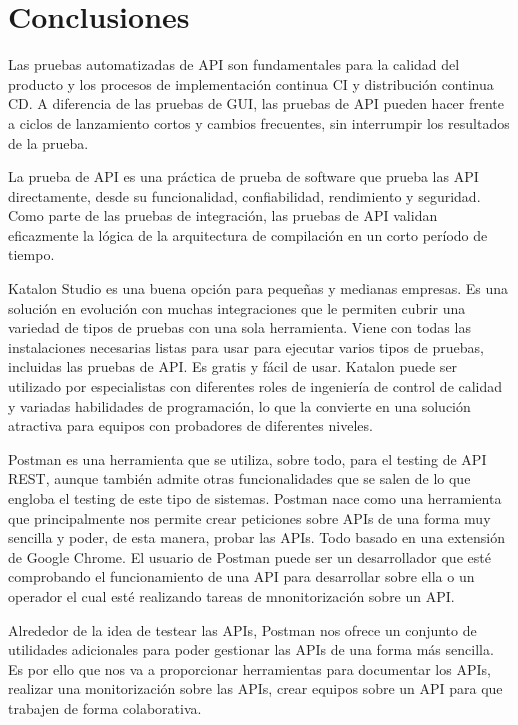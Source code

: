 \documentclass[twoside,twocolumn]{article}
\begin{document}


\section{Conclusiones}

Las pruebas automatizadas de API son fundamentales para la calidad del producto y los procesos de implementación continua CI y distribución continua CD. A diferencia de las pruebas de GUI, las pruebas de API pueden hacer frente a ciclos de lanzamiento cortos y cambios frecuentes, sin interrumpir los resultados de la prueba.

La prueba de API es una práctica de prueba de software que prueba las API directamente, desde su funcionalidad, confiabilidad, rendimiento y seguridad. Como parte de las pruebas de integración, las pruebas de API validan eficazmente la lógica de la arquitectura de compilación en un corto período de tiempo. 

Katalon Studio es una buena opción para pequeñas y medianas empresas. Es una solución en evolución con muchas integraciones que le permiten cubrir una variedad de tipos de pruebas con una sola herramienta. Viene con todas las instalaciones necesarias listas para usar para ejecutar varios tipos de pruebas, incluidas las pruebas de API. Es gratis y fácil de usar. Katalon puede ser utilizado por especialistas con diferentes roles de ingeniería de control de calidad y variadas habilidades de programación, lo que la convierte en una solución atractiva para equipos con probadores de diferentes niveles.

Postman es una herramienta que se utiliza, sobre todo, para el testing de API REST, aunque también admite otras funcionalidades que se salen de lo que engloba el testing de este tipo de sistemas. Postman nace como una herramienta que principalmente nos permite crear peticiones sobre APIs de una forma muy sencilla y poder, de esta manera, probar las APIs. Todo basado en una extensión de Google Chrome. El usuario de Postman puede ser un desarrollador que esté comprobando el funcionamiento de una API para desarrollar sobre ella o un operador el cual esté realizando tareas de mnonitorización sobre un API.

Alrededor de la idea de testear las APIs, Postman nos ofrece un conjunto de utilidades adicionales para poder gestionar las APIs de una forma más sencilla. Es por ello que nos va a proporcionar herramientas para documentar los APIs, realizar una monitorización sobre las APIs, crear equipos sobre un API para que trabajen de forma colaborativa.
\end{document}
